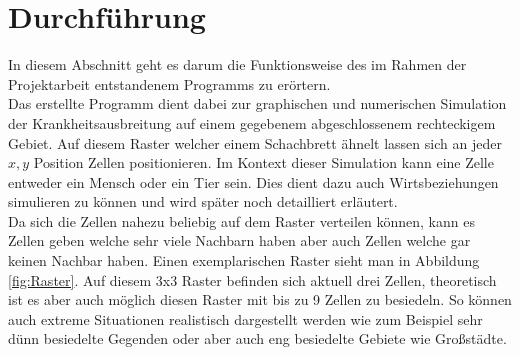 \section*{Durchführung}
In diesem Abschnitt geht es darum die Funktionsweise des im Rahmen der Projektarbeit entstandenem Programms zu erörtern. \\
Das erstellte Programm dient dabei zur graphischen und numerischen Simulation der Krankheitsausbreitung auf einem gegebenem abgeschlossenem  rechteckigem Gebiet. Auf diesem \glqq{}Raster\grqq{} welcher einem Schachbrett ähnelt lassen sich an jeder $ x,y $ Position Zellen positionieren. Im Kontext dieser Simulation kann eine Zelle entweder ein Mensch oder ein Tier sein. Dies dient dazu auch Wirtsbeziehungen simulieren zu können und wird später noch detailliert erläutert.\\
Da sich die Zellen nahezu beliebig auf dem Raster verteilen können, kann es Zellen geben welche sehr viele Nachbarn haben aber auch Zellen welche gar keinen Nachbar haben. Einen exemplarischen Raster sieht man in  Abbildung \ref{fig:Raster}. Auf diesem 3x3 Raster befinden sich aktuell drei Zellen, theoretisch ist es aber auch möglich diesen Raster mit bis zu 9 Zellen zu besiedeln. So können auch extreme Situationen realistisch dargestellt werden wie zum Beispiel sehr dünn besiedelte Gegenden oder aber auch eng besiedelte Gebiete wie Großstädte.



